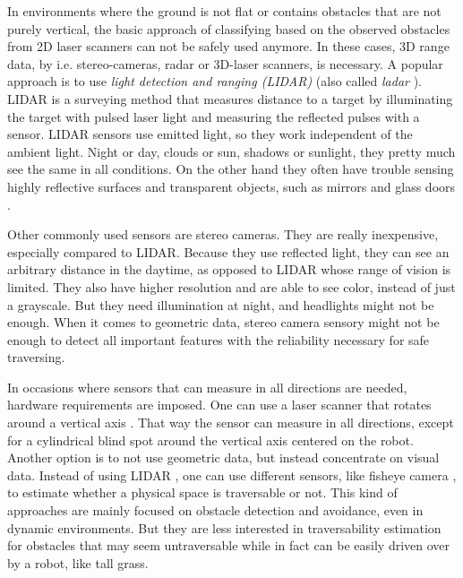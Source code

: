 \documentclass[12pt,a4paper]{report}
\newcommand{\term}{\textit}
\newcommand{\acronym}{\MakeUppercase}
\begin{document}
	
	In environments where the ground is not flat or contains obstacles that are 
	not purely vertical, the basic approach of classifying based on the observed 
	obstacles from \acronym{2d} laser scanners can not be safely used anymore. 
	In these cases, \acronym{3d} range data, by i.e. stereo-cameras, radar or 
	\acronym{3d}-laser scanners, is necessary. A popular approach is to use 
	\term{light detection and ranging (\acronym{lidar})} \cite{Suger, Lalonde} (also 
	called \term{ladar} \cite{Lalonde, Shneier}). \acronym{lidar} is a surveying 
	method that measures distance to a target by illuminating the target with pulsed 
	laser light and measuring the reflected pulses with a sensor. \acronym{lidar} 
	sensors use emitted light, so they work independent of the ambient light. Night 
	or day, clouds or sun, shadows or sunlight, they pretty much see the same in all 
	conditions. On the other hand they often have trouble sensing highly reflective 
	surfaces and transparent objects, such as mirrors and glass doors 
	\cite{HiroseGonet}.
	\par
	Other commonly used sensors are stereo cameras. They are really inexpensive, 
	especially compared to \acronym{lidar}. Because they use reflected light, they 
	can see an arbitrary distance in the daytime, as opposed to \acronym{lidar} 
	whose range of vision is limited. They also have higher resolution and are able 
	to see color, instead of just a grayscale. But they need illumination at night, 
	and headlights might not be enough. When it comes to geometric data, stereo 
	camera sensory might not be enough to detect all important features with the 
	reliability necessary for safe traversing.
	\par
	In occasions where sensors that can measure in all directions are needed, 
	hardware requirements are imposed. One can use a laser scanner that rotates 
	around a vertical axis \cite{Droeschel}. That way the sensor can measure in 
	all directions, except for a cylindrical blind spot around the vertical axis 
	centered on the robot.
	\\
	
	Another option is to not use geometric data, but instead concentrate on visual 
	data. Instead of using \acronym{lidar} \cite{Suger, Lalonde}, one can use 
	different sensors, like fisheye camera \cite{Hirose, HiroseGonet}, 
	to estimate whether a physical space is traversable or not. This kind of 
	approaches are mainly focused on obstacle detection and avoidance, even in 
	dynamic environments. But they are less interested in traversability 
	estimation for obstacles that may seem untraversable while in fact can be 
	easily driven over by a robot, like tall grass.
	\\
	
\end{document}
